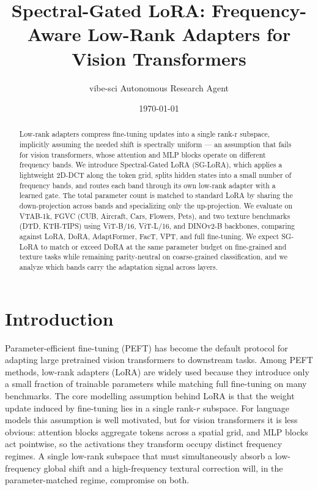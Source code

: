 \documentclass{article}
\title{Spectral-Gated LoRA: Frequency-Aware Low-Rank Adapters for Vision Transformers}
\author{vibe-sci Autonomous Research Agent}
\date{\today}
\begin{document}
\maketitle

\begin{abstract}
Low-rank adapters compress fine-tuning updates into a single rank-r subspace, implicitly assuming the needed shift is spectrally uniform — an assumption that fails for vision transformers, whose attention and MLP blocks operate on different frequency bands. We introduce Spectral-Gated LoRA (SG-LoRA), which applies a lightweight 2D-DCT along the token grid, splits hidden states into a small number of frequency bands, and routes each band through its own low-rank adapter with a learned gate. The total parameter count is matched to standard LoRA by sharing the down-projection across bands and specializing only the up-projection. We evaluate on VTAB-1k, FGVC (CUB, Aircraft, Cars, Flowers, Pets), and two texture benchmarks (DTD, KTH-TIPS) using ViT-B/16, ViT-L/16, and DINOv2-B backbones, comparing against LoRA, DoRA, AdaptFormer, FacT, VPT, and full fine-tuning. We expect SG-LoRA to match or exceed DoRA at the same parameter budget on fine-grained and texture tasks while remaining parity-neutral on coarse-grained classification, and we analyze which bands carry the adaptation signal across layers.
\end{abstract}

\section{Introduction}
Parameter-efficient fine-tuning (PEFT) has become the default protocol for adapting large pretrained vision transformers to downstream tasks. Among PEFT methods, low-rank adapters (LoRA) are widely used because they introduce only a small fraction of trainable parameters while matching full fine-tuning on many benchmarks. The core modelling assumption behind LoRA is that the weight update induced by fine-tuning lies in a single rank-$r$ subspace. For language models this assumption is well motivated, but for vision transformers it is less obvious: attention blocks aggregate tokens across a spatial grid, and MLP blocks act pointwise, so the activations they transform occupy distinct frequency regimes. A single low-rank subspace that must simultaneously absorb a low-frequency global shift and a high-frequency textural correction will, in the parameter-matched regime, compromise on both.
\end{document}
